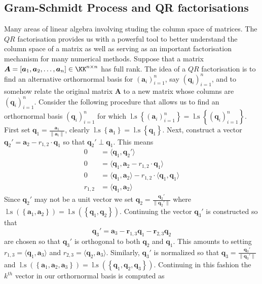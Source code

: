 \subsection{Gram-Schmidt Process and QR factorisations}\label{Section4.2}

Many areas of linear algebra involving studing the column space of matrices. The $QR$ factorisation provides us with a powerful tool to better understand the column space of a matrix as well as serving as an important factorisation mechanism for many numerical methods. Suppose that a matrix $\bm{A} = \left[ \bm{a}_1 , \bm{a}_2 , \ldots , \bm{a}_n \right] \in \KK^{n \times n}$ has full rank. The idea of a $QR$ factorisation is to find an alternative orthornormal basis for $\left( \bm{a}_i \right)_{i=1}^{n}$, say $\left( \bm{q}_i \right)_{i=1}^{n}$, and to somehow relate the original matrix $\bm{A}$ to a new matrix whose columns are $\left( \bm{q}_i \right)_{i=1}^{n}$. Consider the following procedure that allows us to find an orthornormal basis $\left( \bm{q}_i \right)_{i=1}^{n}$ for which $\operatorname{l.s} \left\{ \left( \bm{a}_i \right)_{i=1}^{n} \right\} = \operatorname{l.s} \left\{ \left( \bm{q}_i \right)_{i=1}^{n} \right\}$. First set $\bm{q}_1 = \frac{\bm{a}_1}{\| \bm{a}_i \|}$, clearly $\operatorname{l.s} \left\{ \bm{a}_1 \right\} = \operatorname{l.s} \left\{ \bm{q}_1 \right\}$. Next, construct a vector $\bm{q}_2' = \bm{a}_2 - r_{1,2} \cdot \bm{q}_1$ so that $\bm{q}_2' \perp \bm{q}_1$. This means
\begin{align*}
    0       & = \langle \bm{q}_1, \bm{q}_2' \rangle                                                   \\
    0       & = \langle \bm{q}_1, \bm{a}_2 - r_{1,2} \cdot \bm{q}_1 \rangle                           \\
    0       & = \langle \bm{q}_1, \bm{a}_2 \rangle - r_{1,2} \cdot \langle \bm{q}_1, \bm{q}_1 \rangle \\
    r_{1,2} & = \langle \bm{q}_1, \bm{a}_2 \rangle
\end{align*}
Since $\bm{q}_2'$ may not be a unit vector we set $\bm{q}_2 = \frac{\bm{q}_2'}{\| \bm{q}_2' \|}$ where $\operatorname{l.s} \left( \left\{ \bm{a}_1, \bm{a}_2 \right\} \right) = \operatorname{l.s} \left( \left\{ \bm{q}_1, \bm{q}_2 \right\} \right)$. Continuing the vector $\bm{q}_3'$ is constructed so that
\[
    \bm{q}_3' = \bm{a}_3 - \bm{r}_{1,3} \bm{q}_1 - \bm{r}_{2,3} \bm{q}_2
\]
are chosen so that $\bm{q}_3'$ is orthogonal to both $\bm{q}_2$ and $\bm{q}_1$. This amounts to setting $r_{1,3} = \langle \bm{q}_1, \bm{a}_3 \rangle$ and $r_{2,3} = \langle \bm{q}_2, \bm{a}_{3} \rangle$. Similarly, $\bm{q}_3'$ is normalized so that $\bm{q}_3 = \frac{\bm{q}_3'}{\| \bm{q}_3' \|}$ and $\operatorname{l.s} \left( \left\{ \bm{a}_1, \bm{a}_2, \bm{a}_3 \right\} \right) = \operatorname{l.s} \left( \left\{ \bm{q}_1, \bm{q}_2, \bm{q}_3 \right\} \right)$. Continuing in this fashion the $k^{th}$ vector in our orthornormal basis is computed as
